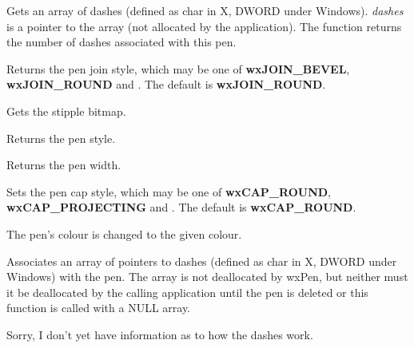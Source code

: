 Gets an array of dashes (defined as char in X, DWORD under Windows).
{\it dashes} is a pointer to the array (not allocated by the application).
The function returns the number of dashes associated with this pen.



Returns the pen join style, which may be one of {\bf wxJOIN\_BEVEL}, {\bf wxJOIN\_ROUND} and
. The default is {\bf wxJOIN\_ROUND}.



Gets the stipple bitmap.



Returns the pen style.



Returns the pen width.



Sets the pen cap style, which may be one of {\bf wxCAP\_ROUND}, {\bf wxCAP\_PROJECTING} and
. The default is {\bf wxCAP\_ROUND}.





The pen's colour is changed to the given colour.



Associates an array of pointers to dashes (defined as char in X, DWORD under Windows)
with the pen. The array is not deallocated by wxPen, but neither must it be
deallocated by the calling application until the pen is deleted or this
function is called with a NULL array.

Sorry, I don't yet have information as to how the dashes work.


